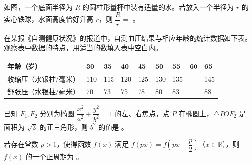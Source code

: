 \Needspace{0.4\textheight}
\begin{question}
如图，一个底面半径为 $R$ 的圆柱形量杯中装有适量的水。若放入一个半径为 $r$ 的实心铁球，水面高度恰好升高 $r$，则 $\dfrac Rr=$ \gkblank{}。
\nopagebreak[4]
\begin{center}\end{center}
\nopagebreak[4]
\end{question}
\begin{question}
在某报《自测健康状况》的报道中，自测血压结果与相应年龄的统计数据如下表。观察表中数据的特点，用适当的数填入表中空白内。

\begin{center}
\begingroup\setlength{\tabcolsep}{4pt}
\begin{tabular}{lllllllll}
\toprule
年龄（岁） & 30 & 35 & 40 & 45 & 50 & 55 & 60 & 65 \\
\midrule
收缩压（水银柱/毫米） & 110 & 115 & 120 & 125 & 130 & 135 &  & 145 \\
舒张压（水银柱/毫米） & 70 & 73 & 75 & 78 & 80 & 83 &  & 88 \\
\bottomrule
\end{tabular}
\endgroup
\end{center}

\end{question}
\begin{question}
已知 $F_1,F_2$ 分别为椭圆 $\dfrac{x^2}{a^2}+\dfrac{y^2}{b^2}=1$ 的左、右焦点，点 $P$ 在椭圆上，$\triangle POF_2$ 是面积为 $\sqrt3$ 的正三角形，则 $b^2$ 的值是 \gkblank{}。

\end{question}
\begin{question}
若存在常数 $p>0$，使得函数 $f(x)$ 满足 $f(px)=f(px-\dfrac p2)$（$x\in\mathbb R$），则 $f(x)$ 的一个正周期为 \gkblank{}。

\end{question}

